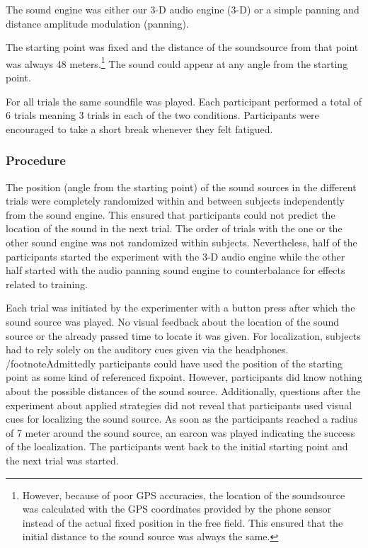 \documentclass[journal]{IEEEtran}
\begin{document}
The sound engine was either our 3-D audio engine (3-D) or a simple panning and distance amplitude modulation (panning).

The starting point was fixed and the distance of the soundsource from that point was always 48 meters.\footnote{However, because of poor GPS accuracies, the location of the soundsource was calculated with the GPS coordinates provided by the phone sensor instead of the actual fixed position in the free field. This ensured that the initial distance to the sound source was always the same.} The sound could appear at any angle from the starting point.

For all trials the same soundfile was played. Each participant performed a total of 6 trials meaning 3 trials in each of the two conditions. Participants were encouraged to take a short break whenever they felt fatigued.

\subsubsection{Procedure}
The position (angle from the starting point) of the sound sources in the different trials were completely randomized within and between subjects independently from the sound engine. This ensured that participants could not predict the location of the sound in the next trial. The order of trials with the one or the other sound engine was not randomized within subjects. Nevertheless, half of the participants started the experiment with the 3-D audio engine while the other half started with the audio panning sound engine to counterbalance for effects related to training.

Each trial was initiated by the experimenter with a button press after which the sound source was played. No visual feedback about the location of the sound source or the already passed time to locate it was given. For localization, subjects had to rely solely on the auditory cues given via the headphones. /footnote{Admittedly participants could have used the position of the starting point as some kind of referenced fixpoint. However, participants did know nothing about the possible distances of the sound source. Additionally, questions after the experiment about applied strategies did not reveal that participants used visual cues for localizing the sound source.} As soon as the participants reached a radius of 7 meter around the sound source, an earcon was played indicating the success of the localization. The participants went back to the initial starting point and the next trial was started.
\end{document}
